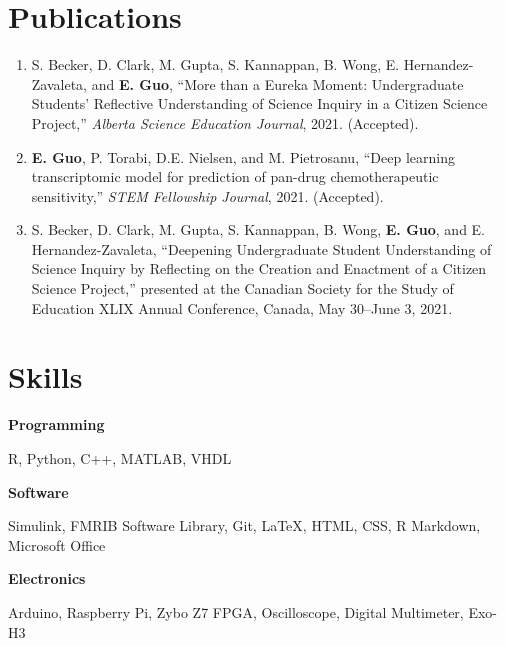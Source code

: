 \documentclass{article}
\begin{document}
\section*{\textcolor{my_colour}{Publications}}
\vspace{-.25em} \hrulefill \vspace{.25em}

\begin{enumerate}[itemsep=1em]
    \item S. Becker, D. Clark, M. Gupta, S. Kannappan, B. Wong, E. Hernandez-Zavaleta, and \textbf{E. Guo}, ``More than a Eureka Moment: Undergraduate Students' Reflective Understanding of Science Inquiry in a Citizen Science Project,'' \textit{Alberta Science Education Journal}, 2021. (Accepted).
    \item \textbf{E. Guo}, P. Torabi, D.E. Nielsen, and M. Pietrosanu, ``Deep learning transcriptomic model for prediction of pan-drug chemotherapeutic sensitivity,'' \textit{STEM Fellowship Journal}, 2021. (Accepted).
    \item S. Becker, D. Clark, M. Gupta, S. Kannappan, B. Wong, \textbf{E. Guo}, and E. Hernandez-Zavaleta, ``Deepening Undergraduate Student Understanding of Science Inquiry by Reflecting on the Creation and Enactment of a Citizen Science Project,'' presented at the Canadian Society for the Study of Education XLIX Annual Conference, Canada, May 30--June 3, 2021.
\end{enumerate}



\section*{\textcolor{my_colour}{Skills}}
\vspace{-.25em} \hrulefill \vspace{.25em}

\textbf{Programming} \hfill \parbox[t]{.8\linewidth}{R, Python, C++, MATLAB, VHDL}

\textbf{Software} \hfill \parbox[t]{0.8\linewidth}{Simulink, FMRIB Software Library, Git, \LaTeX, HTML, CSS, R Markdown, Microsoft Office}

\textbf{Electronics} \hfill \parbox[t]{0.8\linewidth}{Arduino, Raspberry Pi, Zybo Z7 FPGA, Oscilloscope, Digital Multimeter, Exo-H3}
\end{document}
